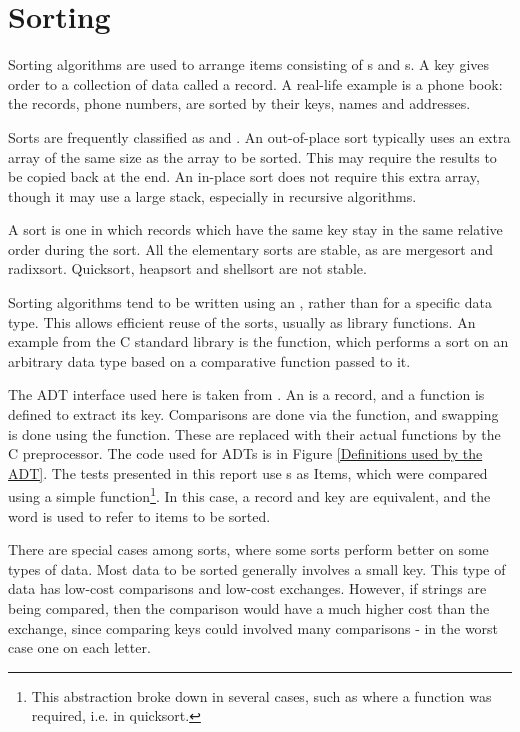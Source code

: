 \label{background}
\section{Sorting}

Sorting algorithms are used to arrange items consisting of s and
s. A key gives order to a collection of data called a record.  A real-life
example is a phone book: the records, phone numbers, are sorted by their keys,
names and addresses.

Sorts are frequently classified as  and . An
out-of-place sort typically uses an extra array of the same size as the array to
be sorted. This may require the results to be copied back at the end. An
in-place sort does not require this extra array, though it may use a large
stack, especially in recursive algorithms.

A  sort is one in which records which have the same key stay in the
same relative order during the sort. All the elementary sorts are stable, as are
mergesort and radixsort. Quicksort, heapsort and shellsort are not stable.

Sorting algorithms tend to be written using an , rather
than for a specific data type. This allows efficient reuse of the sorts, usually
as library functions. An example from the C standard library is the 
function, which performs a sort on an arbitrary data type based on a comparative
function passed to it.

The ADT interface used here is taken from \cite{Sedgewick02}. An 
is a record, and a function is defined to extract its key.  Comparisons are done
via the  function, and swapping is done using the  function.
These are replaced with their actual functions by the C preprocessor. The code
used for ADTs is in Figure \vref{Definitions used by the ADT}. The tests
presented in this report use s as Items, which were
compared using a simple  function\footnote{This abstraction broke
down in several cases, such as where a  function was required,
i.e. in quicksort.}.  In this case, a record and key are equivalent, and the
word  is used to refer to items to be sorted.


There are special cases among sorts, where some sorts perform better on some
types of data. Most data to be sorted generally involves a small key.  This type
of data has low-cost comparisons and low-cost exchanges.  However, if strings
are being compared, then the comparison would have a much higher cost than the
exchange, since comparing keys could involved many comparisons - in the worst
case one on each letter. 

